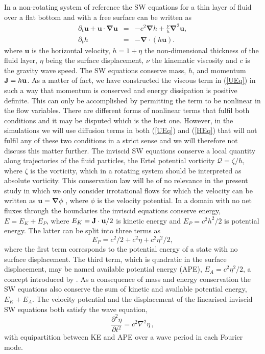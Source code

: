\documentclass{jfm}
\providecommand\bnabla{\boldsymbol{\nabla}}
\newcommand\p{\ensuremath{\partial}}
\newcommand{\uu}{\textbf{u}}
\newcommand{\ErtelPV}{\mathcal{Q}}
\begin{document}
In a non-rotating system of reference the SW equations for a thin layer of fluid over a flat bottom and with a free
surface can be written as  \cite[see for example][]{VallisLIVRE2006}
\begin{eqnarray} \label{UEq}
\p_t \uu + \uu\cdot \bnabla  \uu   
&=& - c^2 \bnabla h + \frac{\nu}{h}  \bnabla^2 \uu,   \label{eq_uu}\\ \label{HEq}
\p_t   h    &=& - \bnabla \cdot (h \uu).  \label{eq_h}
\end{eqnarray}
where $\uu$ is the horizontal velocity, %
$h = 1 + \eta $ the non-dimensional thickness of the fluid layer,  $ \eta $ being the surface displacement, 
$\nu$ the kinematic viscosity and $ c $ is the gravity wave speed. The SW equations conserve mass, $ h $, and momentum $ {\bf J} = h{\bf u} $. As a matter of fact, we have constructed the viscous term in (\ref{UEq}) in such a way that momentum is conserved and energy dissipation is positive definite. This can only be accomplished by permitting the term to be nonlinear in the flow variables. There are different forms of nonlinear terms that fulfil both conditions and it may be disputed which is the best one. However, in the simulations we will use diffusion terms in both (\ref{UEq}) and (\ref{HEq}) that will not fulfil any of these two conditions in a strict sense and we will therefore not discuss this matter further. The inviscid SW equations conserve a local
quantity along trajectories of the fluid particles, the Ertel
potential vorticity $\ErtelPV = \zeta /h$, where $\zeta  $ is the vorticity, which in a rotating system should be interpreted as absolute vorticity.  This conservation law will be of no relevance in the present study in which we only consider
irrotational flows for which the velocity can be written as $ \uu = \bnabla \phi $ , where $ \phi $ is the velocity potential. In a domain with no net fluxes through the boundaries the inviscid equations conserve energy, $ E = E_K + E_P $, where $ E_K =   {\bf J}  \cdot {\uu} /2 $ is kinetic energy and $ E_P = c^{2} h^2/2 $ is potential energy. The latter can be split into three terms as \begin{equation}
E_P = c^2/2 + c^2\eta+ c^2 \eta^2/2, 
\end{equation}
where the first term corresponds to the potential energy of a state with no
surface displacement.  The third term, which is quadratic in the surface displacement, may be named available potential energy (APE),
$E_A = c^2\eta^2/2$, a concept introduced by  \cite{Lorenz1955}. As a consequence of mass and energy conservation the SW equations also conserve the sum of kinetic and available potential energy, $ E_K + E_A $.
 The velocity potential and the displacement of the linearised inviscid SW equations both satisfy the wave equation,
\begin{equation}
\frac{\partial ^2 \eta}{\partial t^2} = c^2 \nabla^2 \eta \, ,
\end{equation}
with equipartition between KE and APE over a wave period in each Fourier mode.
\end{document}
